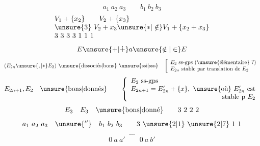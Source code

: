 
\[
a_1\ a_2\ a_3\qquad b_1\ b_2\ b_3
\]
\[
\begin{array}{l}
V_1+\{x_2\}\qquad V_2+\{x_3\}\\
\unsure{3}\ V_2+x_3\unsure{\ast|\notin}V_1+\{x_2+x_3\}\\
3\ 3\ 3\ 3\ 1\ 1\ 1
\end{array}
\]
\[
E\unsure{+|\dotplus}a\unsure{\notin|\in}E
\]
\[
(E_{2n}\unsure{,|\ast}E_2)\ \text{\unsure{dissociés|bons}}\ \text{\unsure{ssi|sss}}\quad
\left[\begin{array}{l}
E_2\text{ ss-gps (\unsure{élémentaire} ?)}\\
E_{2n}\text{ stable par translation de }E_2
\end{array}\right.
\]
\[
E_{2n+1},E_2\quad\text{\unsure{bons|donnés}}\qquad
\left\{\begin{array}{l}
E_2\text{ ss-gps}\\
E_{2n+1}=E'_{2n}+\{x\},\ \text{\unsure{où}}\ E'_{2n}\text{ est}\\
\hfill\text{stable p }E_2
\end{array}\right.
\]
\[
E_3\quad E_3\quad\text{\unsure{bons|donné}}\qquad 3\ 2\ 2\ 2
\]
\[
a_1\ a_2\ a_3\quad\unsure{''}\quad b_1\ b_2\ b_3\qquad 3\ \unsure{2|1}\ \unsure{2|7}\ 1\ 1
\]
\[
\cdots
\]
\[
0\ a\ a'\qquad 0\ a\ b'
\]

